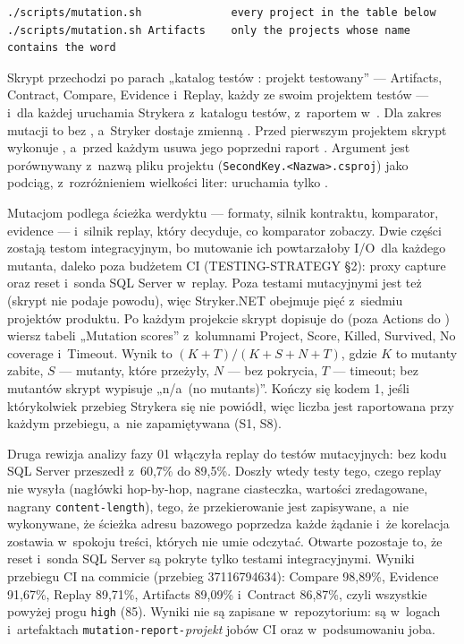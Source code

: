 \begin{lstlisting}
./scripts/mutation.sh              every project in the table below
./scripts/mutation.sh Artifacts    only the projects whose name contains the word
\end{lstlisting}

Skrypt przechodzi po parach „katalog testów : projekt testowany” --- Artifacts, Contract,
Compare, Evidence i~Replay, każdy ze swoim projektem testów --- i~dla każdej uruchamia
Strykera z~katalogu testów, z~raportem w~. Dla
 zakres mutacji to  bez ,
a~Stryker dostaje zmienną . Przed pierwszym projektem skrypt
wykonuje , a~przed każdym usuwa jego poprzedni raport
. Argument jest porównywany z~nazwą pliku projektu
(\texttt{SecondKey.<Nazwa>.csproj}) jako podciąg, z~rozróżnieniem wielkości liter:
 uruchamia tylko .

Mutacjom podlega ścieżka werdyktu --- formaty, silnik kontraktu, komparator, evidence --- i~silnik replay, który decyduje, co komparator zobaczy. Dwie części zostają testom
integracyjnym, bo mutowanie ich powtarzałoby I/O~dla każdego mutanta, daleko poza budżetem
CI (TESTING-STRATEGY §2): proxy capture oraz reset i~sonda SQL Server w~replay. Poza testami
mutacyjnymi jest też  (skrypt nie podaje powodu), więc Stryker.NET obejmuje
pięć z~siedmiu projektów produktu. Po każdym
projekcie skrypt dopisuje do  (poza Actions do
) wiersz tabeli „Mutation scores” z~kolumnami Project, Score, Killed,
Survived, No coverage i~Timeout. Wynik to $(K + T) / (K + S + N + T)$, gdzie $K$ to mutanty
zabite, $S$ --- mutanty, które przeżyły, $N$ --- bez pokrycia, $T$ --- timeout; bez mutantów
skrypt wypisuje „n/a~(no mutants)”. Kończy się kodem 1, jeśli którykolwiek przebieg Strykera
się nie powiódł, więc liczba jest raportowana przy każdym przebiegu, a~nie zapamiętywana
(S1, S8).

Druga rewizja analizy fazy 01 włączyła replay do testów mutacyjnych: 
bez kodu SQL Server przeszedł z~60,7\% do 89,5\%. Doszły wtedy testy tego, czego replay nie
wysyła (nagłówki hop-by-hop, nagrane ciasteczka, wartości zredagowane, nagrany
\texttt{content-length}), tego, że przekierowanie jest zapisywane, a~nie wykonywane, że
ścieżka adresu bazowego poprzedza każde żądanie i~że korelacja zostawia w~spokoju treści,
których nie umie odczytać. Otwarte pozostaje to, że reset i~sonda SQL Server są pokryte
tylko testami integracyjnymi. Wyniki przebiegu CI na commicie  (przebieg 37116794634):
Compare 98,89\%, Evidence 91,67\%, Replay 89,71\%, Artifacts 89,09\% i~Contract 86,87\%, czyli wszystkie
powyżej progu \texttt{high} (85). Wyniki nie są zapisane w~repozytorium: są w~logach i~artefaktach
\texttt{mutation-report-}\emph{projekt} jobów CI oraz w~podsumowaniu joba.

